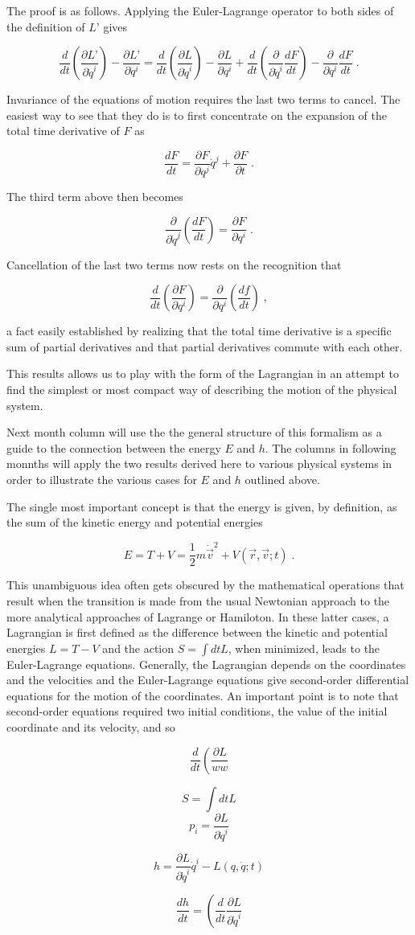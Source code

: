 \documentclass[12pt]{article}
\begin{document}
The proof is as follows. Applying the Euler-Lagrange operator to both sides of the definition of $L’$ gives

\[ \frac{d}{dt} \left( \frac{\partial L’}{ \partial {\dot q}^i } \right) - \frac{\partial L’}{\partial q^i} = \frac{d}{dt} \left( \frac{\partial L}{ \partial {\dot q}^i } \right) - \frac{\partial L}{\partial q^i} + \frac{d}{dt} \left( \frac{\partial}{\partial {\dot q}^i} \frac{dF}{dt} \right) - \frac{\partial}{\partial q^i} \frac{dF}{dt} \;. \]

Invariance of the equations of motion requires the last two terms to cancel.  The easiest way to see that they do is to first concentrate on the expansion of the total time derivative of $F$ as

\[ \frac{d F}{dt} = \frac{\partial F}{\partial q^j} {\dot q}^j + \frac{\partial F}{\partial t} \; . \]

The third term above then becomes

\[ \frac{\partial}{\partial {\dot q}^j} \left( \frac{d F}{dt} \right) = \frac{\partial F}{\partial q^i} \; . \]

Cancellation of the last two terms now rests on the recognition that 

\[ \frac{d}{dt} \left( \frac{\partial F}{\partial q^i} \right) = \frac{\partial}{\partial q^i} \left(\frac{df}{dt} \right) \; ,\]

a fact easily established by realizing that the total time derivative is a specific sum of partial derivatives and that partial derivatives commute with each other.

This results allows us to play with the form of the Lagrangian in an attempt to find the simplest or most compact way of describing the motion of the physical system.

Next month column will use the the general structure of this formalism as a guide to the connection between the energy $E$ and $h$.  The columns in following monnths will apply the two results derived here to various physical systems in order to illustrate the various cases for $E$ and $h$ outlined above.  

The single most important concept is that the energy is given, by definition, as the sum of the kinetic energy and potential energies

\[ E = T + V = \frac{1}{2} m \dot {\vec v} ^2 + V(\vec r, \vec v; t) \; . \]

This unambiguous idea often gets obscured by the mathematical operations that result when the transition is made from the usual Newtonian approach to the more analytical approaches of Lagrange or Hamiloton.  In these latter cases, a Lagrangian is first defined as the difference between the kinetic and potential energies $L = T - V$ and the action $S = \int dt L $, when minimized, leads to the Euler-Lagrange equations.  Generally, the Lagrangian depends on the coordinates and the velocities and the Euler-Lagrange equations give second-order differential equations for the motion of the coordinates.  An important point is to note that second-order equations required two initial conditions, the value of the initial coordinate and its velocity, and so 

\[ \frac{d}{dt} \left( \frac{\partial L}{ww} \right.\]

\[ S = \int dt L \] 
\[ p_i = \frac{\partial L}{\partial {\dot q}^i} \]

\[ h = \frac{\partial L}{\partial {\dot q}^i} {\dot q}^i - L(q,\dot q;t) \]

\[ \frac{d h}{dt} = \left( \frac{d}{dt} \frac{\partial L}{\partial {\dot q}^i} \right. \]
\end{document}
